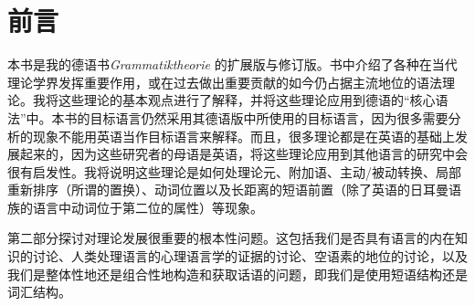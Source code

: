 \chapter{前言}

本书是我的德语书\emph{Grammatiktheorie} \citep{MuellerGTBuch2}的扩展版与修订版。书中介绍了各种在当代理论学界发挥重要作用，或在过去做出重要贡献的如今仍占据主流地位的语法理论。我将这些理论的基本观点进行了解释，并将这些理论应用到德语的“核心语法”中。本书的目标语言仍然采用其德语版中所使用的目标语言，因为很多需要分析的现象不能用英语当作目标语言来解释。而且，很多理论都是在英语的基础上发展起来的，因为这些研究者的母语是英语，将这些理论应用到其他语言的研究中会很有启发性。我将说明这些理论是如何处理论元、附加语、主动/被动转换、局部重新排序（所谓的置换）、动词位置以及长距离的短语前置（除了英语的日耳曼语族的语言中动词位于第二位的属性）等现象。

第二部分探讨对理论发展很重要的根本性问题。这包括我们是否具有语言的内在知识的讨论、人类处理语言的心理语言学的证据的讨论、空语素的地位的讨论，以及我们是整体性地还是组合性地构造和获取话语的问题，即我们是使用短语结构还是词汇结构。

